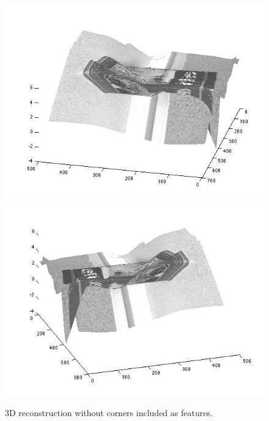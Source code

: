 \begin{figure}[H]
\begin{center}
\includegraphics[width=0.45\linewidth]{figures/nocorners1.jpg}
\includegraphics[width=0.45\linewidth]{figures/nocorners2.jpg}
\end{center}
\caption{3D reconstruction without corners included as features.}
\label{zhang_nocorners}
\end{figure}

